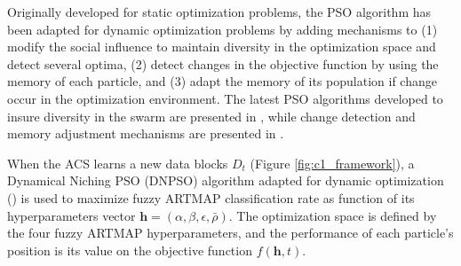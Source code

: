 Originally developed for static optimization problems, the PSO algorithm has been adapted for dynamic optimization problems by adding mechanisms to (1) modify the social influence to maintain diversity in the optimization space and detect several optima, (2) detect changes in the objective function by using the memory of each particle, and (3) adapt the memory of its population if change occur in the optimization environment. The latest PSO algorithms developed to insure diversity in the swarm are presented in \cite{du08, li06, nickabadi08_1, ozcan07}, while change detection and memory adjustment mechanisms are presented in \cite{blackwell04, carlisle02, hu02, wang07}.

When the ACS learns a new data blocks $D_t$ (Figure \ref{fig:c1_framework}), a Dynamical Niching PSO (DNPSO) algorithm adapted for dynamic optimization (\cite{nickabadi08_2}) is used to maximize fuzzy ARTMAP classification rate as function of its hyperparameters vector $\textbf{h}=\left(\alpha, \beta, \epsilon, \bar{\rho}\right)$. The optimization space is defined by the four fuzzy ARTMAP hyperparameters, and the performance of each particle's position is its value on the objective function $f(\textbf{h},t)$.

